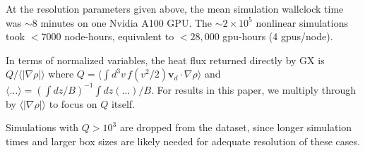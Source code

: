 \documentclass{jpp}
\newcommand{\changed}[1]{{#1}}
\begin{document}
At \changed{the resolution parameters given above}, the mean simulation wallclock time was $\sim 8$ minutes on one Nvidia A100 GPU.
The $\sim 2\times 10^5$ nonlinear simulations took $<7000$ node-hours, equivalent to $<28,000$ gpu-hours (4 gpus/node).


In terms of normalized variables, the heat flux returned directly by GX is $Q / \langle |\nabla\rho|\rangle$ where $Q=\langle \int d^3v\, f (v^2/2) \mathbf{v}_d\cdot\nabla\rho \rangle$ and $\langle \ldots \rangle=(\int dz/B)^{-1} \int dz (\ldots)/B$.
For results in this paper, we multiply through by $\langle |\nabla\rho|\rangle$ to focus on $Q$ itself.

Simulations with $Q>10^3$ are dropped from the dataset, since longer simulation times and larger box sizes are likely needed for adequate resolution of these cases.






\end{document}

